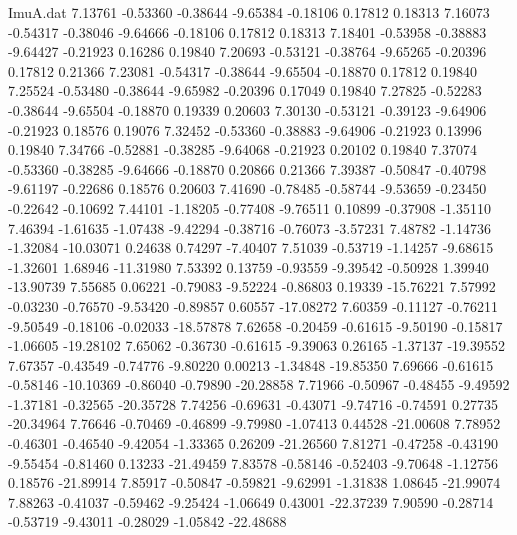 \begin{filecontents}{ImuA.dat}
   7.13761   -0.53360   -0.38644   -9.65384   -0.18106    0.17812    0.18313
   7.16073   -0.54317   -0.38046   -9.64666   -0.18106    0.17812    0.18313
   7.18401   -0.53958   -0.38883   -9.64427   -0.21923    0.16286    0.19840
   7.20693   -0.53121   -0.38764   -9.65265   -0.20396    0.17812    0.21366
   7.23081   -0.54317   -0.38644   -9.65504   -0.18870    0.17812    0.19840
   7.25524   -0.53480   -0.38644   -9.65982   -0.20396    0.17049    0.19840
   7.27825   -0.52283   -0.38644   -9.65504   -0.18870    0.19339    0.20603
   7.30130   -0.53121   -0.39123   -9.64906   -0.21923    0.18576    0.19076
   7.32452   -0.53360   -0.38883   -9.64906   -0.21923    0.13996    0.19840
   7.34766   -0.52881   -0.38285   -9.64068   -0.21923    0.20102    0.19840
   7.37074   -0.53360   -0.38285   -9.64666   -0.18870    0.20866    0.21366
   7.39387   -0.50847   -0.40798   -9.61197   -0.22686    0.18576    0.20603
   7.41690   -0.78485   -0.58744   -9.53659   -0.23450   -0.22642   -0.10692
   7.44101   -1.18205   -0.77408   -9.76511    0.10899   -0.37908   -1.35110
   7.46394   -1.61635   -1.07438   -9.42294   -0.38716   -0.76073   -3.57231
   7.48782   -1.14736   -1.32084  -10.03071    0.24638    0.74297   -7.40407
   7.51039   -0.53719   -1.14257   -9.68615   -1.32601    1.68946  -11.31980
   7.53392    0.13759   -0.93559   -9.39542   -0.50928    1.39940  -13.90739
   7.55685    0.06221   -0.79083   -9.52224   -0.86803    0.19339  -15.76221
   7.57992   -0.03230   -0.76570   -9.53420   -0.89857    0.60557  -17.08272
   7.60359   -0.11127   -0.76211   -9.50549   -0.18106   -0.02033  -18.57878
   7.62658   -0.20459   -0.61615   -9.50190   -0.15817   -1.06605  -19.28102
   7.65062   -0.36730   -0.61615   -9.39063    0.26165   -1.37137  -19.39552
   7.67357   -0.43549   -0.74776   -9.80220    0.00213   -1.34848  -19.85350
   7.69666   -0.61615   -0.58146  -10.10369   -0.86040   -0.79890  -20.28858
   7.71966   -0.50967   -0.48455   -9.49592   -1.37181   -0.32565  -20.35728
   7.74256   -0.69631   -0.43071   -9.74716   -0.74591    0.27735  -20.34964
   7.76646   -0.70469   -0.46899   -9.79980   -1.07413    0.44528  -21.00608
   7.78952   -0.46301   -0.46540   -9.42054   -1.33365    0.26209  -21.26560
   7.81271   -0.47258   -0.43190   -9.55454   -0.81460    0.13233  -21.49459
   7.83578   -0.58146   -0.52403   -9.70648   -1.12756    0.18576  -21.89914
   7.85917   -0.50847   -0.59821   -9.62991   -1.31838    1.08645  -21.99074
   7.88263   -0.41037   -0.59462   -9.25424   -1.06649    0.43001  -22.37239
   7.90590   -0.28714   -0.53719   -9.43011   -0.28029   -1.05842  -22.48688

\end{filecontents}
